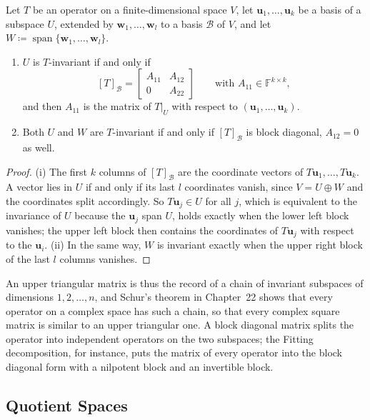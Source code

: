 \begin{proposition}
\label{prop:block-triangular}
Let $T$ be an operator on a finite-dimensional space $V$, let $\mathbf u_1,\ldots,\mathbf u_k$ be a basis of a subspace $U$, extended by $\mathbf w_1,\ldots,\mathbf w_l$ to a basis $\mathcal B$ of $V$, and let $W\coloneqq\operatorname{span}\{\mathbf w_1,\ldots,\mathbf w_l\}$.
\begin{enumerate}
\item $U$ is $T$-invariant if and only if
\[
[T]_{\mathcal B}=\begin{bmatrix}A_{11}&A_{12}\\0&A_{22}\end{bmatrix}\qquad\text{with }A_{11}\in\mathbb F^{k\times k},
\]
and then $A_{11}$ is the matrix of $T|_U$ with respect to $(\mathbf u_1,\ldots,\mathbf u_k)$.
\item Both $U$ and $W$ are $T$-invariant if and only if $[T]_{\mathcal B}$ is block diagonal, $A_{12}=0$ as well.
\end{enumerate}
\end{proposition}

\begin{proof}
(i) The first $k$ columns of $[T]_{\mathcal B}$ are the coordinate vectors of $T\mathbf u_1,\ldots,T\mathbf u_k$. A vector lies in $U$ if and only if its last $l$ coordinates vanish, since $V=U\oplus W$ and the coordinates split accordingly. So $T\mathbf u_j\in U$ for all $j$, which is equivalent to the invariance of $U$ because the $\mathbf u_j$ span $U$, holds exactly when the lower left block vanishes; the upper left block then contains the coordinates of $T\mathbf u_j$ with respect to the $\mathbf u_i$. (ii) In the same way, $W$ is invariant exactly when the upper right block of the last $l$ columns vanishes.
\end{proof}

An upper triangular matrix is thus the record of a chain of invariant subspaces of dimensions $1,2,\ldots,n$, and Schur's theorem in Chapter~22 shows that every operator on a complex space has such a chain, so that every complex square matrix is similar to an upper triangular one. A block diagonal matrix splits the operator into independent operators on the two subspaces; the Fitting decomposition, for instance, puts the matrix of every operator into the block diagonal form with a nilpotent block and an invertible block.

\subsection{Quotient Spaces}

